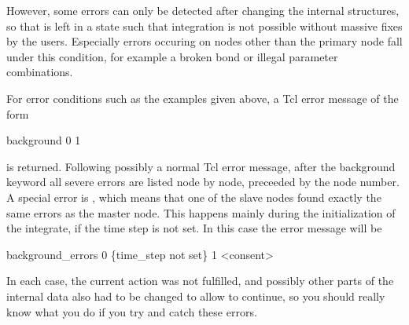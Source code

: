 However, some errors can only be detected after changing the internal
structures, so that \es is left in a state such that integration is
not possible without massive fixes by the users. Especially errors
occuring on nodes other than the primary node fall under this
condition, for example a broken bond or illegal parameter
combinations.

For error conditions such as the examples given above, a Tcl error
message of the form
\begin{code}
 background 0   1 
\end{code}
is returned. Following possibly a normal Tcl error message, after the
background keyword all severe errors are listed node by node,
preceeded by the node number. A special error is ,
which means that one of the slave nodes found exactly the same errors
as the master node. This happens mainly during the initialization of
the integrate, \eg if the time step is not set. In this case the error
message will be
\begin{code}
background\_errors 0 \{time\_step not set\} 1 <consent> 
\end{code}
In each case, the current action was not fulfilled, and possibly other
parts of the internal data also had to be changed to allow \es to
continue, so you should really know what you do if you try and catch
these errors.


